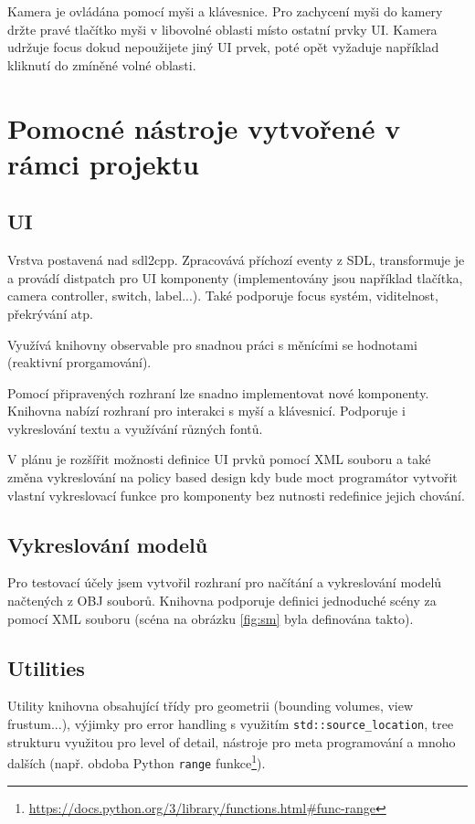 \documentclass[12pt,a4paper,titlepage,final]{report}
\begin{document}
Kamera je ovládána pomocí myši a klávesnice. Pro zachycení myši do kamery držte pravé tlačítko myši v libovolné oblasti místo ostatní prvky UI. Kamera udržuje focus dokud nepoužijete jiný UI prvek, poté opět vyžaduje například kliknutí do zmíněné volné oblasti.


\section{Pomocné nástroje vytvořené v rámci projektu}
\subsection{UI}
Vrstva postavená nad sdl2cpp. Zpracovává příchozí eventy z SDL, transformuje je a provádí distpatch pro UI komponenty (implementovány jsou například tlačítka, camera controller, switch, label...). Také podporuje focus systém, viditelnost, překrývání atp.

Využívá knihovny observable pro snadnou práci s měnícími se hodnotami (reaktivní prorgamování).

Pomocí připravených rozhraní lze snadno implementovat nové komponenty. Knihovna nabízí rozhraní pro interakci s myší a klávesnicí. Podporuje i vykreslování textu a využívání různých fontů.

V plánu je rozšířit možnosti definice UI prvků pomocí XML souboru a také změna vykreslování na policy based design kdy bude moct programátor vytvořit vlastní vykreslovací funkce pro komponenty bez nutnosti redefinice jejich chování.

\subsection{Vykreslování modelů}
Pro testovací účely jsem vytvořil rozhraní pro načítání a vykreslování modelů načtených z OBJ souborů. Knihovna podporuje definici jednoduché scény za pomocí XML souboru (scéna na obrázku \ref{fig:sm} byla definována takto). 

\subsection{Utilities}
Utility knihovna obsahující třídy pro geometrii (bounding volumes, view frustum...), výjimky pro error handling s využitím \texttt{std::source\_location}, tree strukturu využitou pro level of detail, nástroje pro meta programování a mnoho dalších (např. obdoba Python \texttt{range} funkce\footnote{\url{https://docs.python.org/3/library/functions.html#func-range}}).
\end{document}
